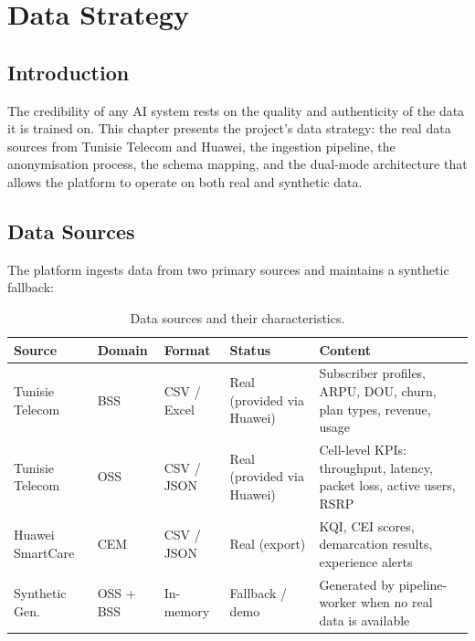 \chapter{Data Strategy}
\label{ch:data}

\section{Introduction}

The credibility of any AI system rests on the quality and authenticity of the data it is trained on. This chapter presents the project's data strategy: the real data sources from Tunisie Telecom and Huawei, the ingestion pipeline, the anonymisation process, the schema mapping, and the dual-mode architecture that allows the platform to operate on both real and synthetic data.

\section{Data Sources}

The platform ingests data from two primary sources and maintains a synthetic fallback:

\begin{table}[H]
\centering
\caption{Data sources and their characteristics.}
\label{tab:data-sources}
\begin{tabularx}{\textwidth}{@{}llllX@{}}
\toprule
\textbf{Source} & \textbf{Domain} & \textbf{Format} & \textbf{Status} & \textbf{Content} \\
\midrule
Tunisie Telecom & BSS & CSV / Excel & Real (provided via Huawei) & Subscriber profiles, ARPU, DOU, churn, plan types, revenue, usage \\
Tunisie Telecom & OSS & CSV / JSON & Real (provided via Huawei) & Cell-level KPIs: throughput, latency, packet loss, active users, RSRP \\
Huawei SmartCare & CEM & CSV / JSON & Real (export) & KQI, CEI scores, demarcation results, experience alerts \\
Synthetic Gen. & OSS + BSS & In-memory & Fallback / demo & Generated by pipeline-worker when no real data is available \\
\bottomrule
\end{tabularx}
\end{table}

